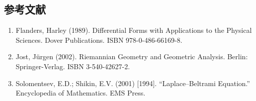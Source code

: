 \subsection{参考文献}
\begin{enumerate}
  \item Flanders, Harley (1989). Differential Forms with Applications to the Physical Sciences. Dover Publications. ISBN 978-0-486-66169-8.
  \item Jost, Jürgen (2002). Riemannian Geometry and Geometric Analysis. Berlin: Springer-Verlag. ISBN 3-540-42627-2.
  \item Solomentsev, E.D.; Shikin, E.V. (2001) [1994]. “Laplace–Beltrami Equation.” Encyclopedia of Mathematics. EMS Press.
\end{enumerate}
